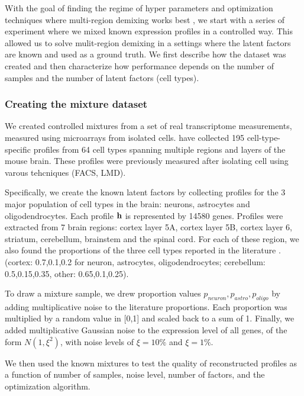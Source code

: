 

With the goal of finding the regime of hyper parameters and optimization techniques where multi-region demixing works best , we start with a series of experiment where we mixed known expression profiles in a controlled way. This allowed us to solve mulit-region demixing in a settings where the latent factors are known and used as a ground truth. We first describe how the dataset was created and then characterize how performance depends on the number of samples and the number of latent factors (cell types).

\subsubsection*{Creating the mixture dataset}
We created controlled mixtures from a set of real transcriptome measurements, measured using microarrays from isolated cells. \citet{okaty2011cell} have collected 195 cell-type-specific profiles from 64 cell types spanning multiple regions and layers of the mouse brain. These profiles were previously measured after isolating cell using varous tehcniques (FACS, LMD).
 
Specifically, we create the known latent factors by collecting profiles for the 3 major population of cell types in the brain: neurons, astrocytes and oligodendrocytes. Each profile $\mathbf{h}$ is represented by 14580 genes. Profiles were extracted from 7 brain regions:  cortex layer 5A, cortex layer 5B, cortex layer 6, striatum, cerebellum, brainstem and the spinal cord. For each of these region, we also found the proportions of the three cell types reported in the literature \cite{Herculano2014}. (cortex:  0.7,0.1,0.2 for neuron, astrocytes, oligodendrocytes; cerebellum: 0.5,0.15,0.35, other: 0.65,0.1,0.25).

To draw a mixture sample, we drew proportion values $p_{neuron},p_{astro},p_{oligo}$ by adding multiplicative noise to the literature proportions. Each proportion was multiplied by a random value in [0,1] and scaled back to a  sum of 1. Finally, we added multiplicative Gaussian noise to the expression level of all genes, of the form $N(1,\xi^2)$, with noise levels of $\xi=10\%$ and $\xi=1\% $.

We then used the known mixtures to test the quality of reconstructed profiles as a function of number of samples, noise level, number of factors, and the optimization algorithm. 





